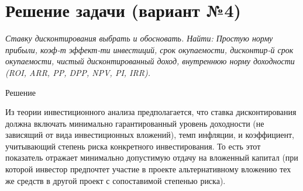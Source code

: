 \section{Решение задачи (вариант №4)}

\begin{table}[!ht]
\end{table}

\textit{Ставку дисконтирования выбрать и обосновать.
	Найти: Простую норму прибыли, коэф-т эффект-ти инвестиций, срок окупаемости, дисконтир-й срок окупаемости, чистый дисконтированный доход, внутреннюю норму доходности (ROI, ARR, PP, DPP, NPV, PI, IRR).}

\begin{center}
	Решение
\end{center}

Из теории инвестиционного анализа предполагается, что ставка дисконтирования должна включать минимально гарантированный уровень доходности (не зависящий от вида инвестиционных вложений), темп инфляции, и коэффициент, учитывающий степень риска конкретного инвестирования. То есть этот показатель отражает минимально допустимую отдачу на вложенный капитал (при которой инвестор предпочтет участие в проекте альтернативному вложению тех же средств в другой проект с сопоставимой степенью риска).

